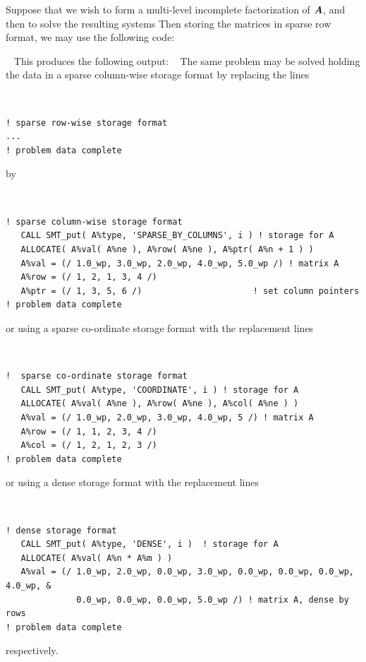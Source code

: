 \documentclass{galahad}
\begin{document}

\galexample
Suppose 
that we wish to form a multi-level incomplete factorization of ${\bm{A}}$,
and then to solve the resulting systems 
Then storing the matrices in sparse row format,
we may use the following code:

{\tt \small
\VerbatimInput{\packageexample}
}
\noindent
This produces the following output:
{\tt \small
\VerbatimInput{\packageresults}
}
\noindent
The same problem may be solved holding the data in 
a sparse column-wise storage format by replacing the lines
{\tt \small
\begin{verbatim}
! sparse row-wise storage format
...
! problem data complete   
\end{verbatim}
}
\noindent
by
{\tt \small
\begin{verbatim}
! sparse column-wise storage format
   CALL SMT_put( A%type, 'SPARSE_BY_COLUMNS', i ) ! storage for A
   ALLOCATE( A%val( A%ne ), A%row( A%ne ), A%ptr( A%n + 1 ) )
   A%val = (/ 1.0_wp, 3.0_wp, 2.0_wp, 4.0_wp, 5.0_wp /) ! matrix A
   A%row = (/ 1, 2, 1, 3, 4 /)
   A%ptr = (/ 1, 3, 5, 6 /)                      ! set column pointers  
! problem data complete   
\end{verbatim}
}
\noindent
or using a sparse co-ordinate storage format with the replacement lines
{\tt \small
\begin{verbatim}
!  sparse co-ordinate storage format
   CALL SMT_put( A%type, 'COORDINATE', i ) ! storage for A
   ALLOCATE( A%val( A%ne ), A%row( A%ne ), A%col( A%ne ) )
   A%val = (/ 1.0_wp, 2.0_wp, 3.0_wp, 4.0_wp, 5 /) ! matrix A
   A%row = (/ 1, 1, 2, 3, 4 /)
   A%col = (/ 1, 2, 1, 2, 3 /)
! problem data complete   
\end{verbatim}
}
\noindent
or using a dense storage format with the replacement lines
{\tt \small
\begin{verbatim}
! dense storage format
   CALL SMT_put( A%type, 'DENSE', i )  ! storage for A
   ALLOCATE( A%val( A%n * A%m ) )
   A%val = (/ 1.0_wp, 2.0_wp, 0.0_wp, 3.0_wp, 0.0_wp, 0.0_wp, 0.0_wp, 4.0_wp, &
              0.0_wp, 0.0_wp, 0.0_wp, 5.0_wp /) ! matrix A, dense by rows
! problem data complete   
\end{verbatim}
}
\noindent
respectively.
\end{document}
